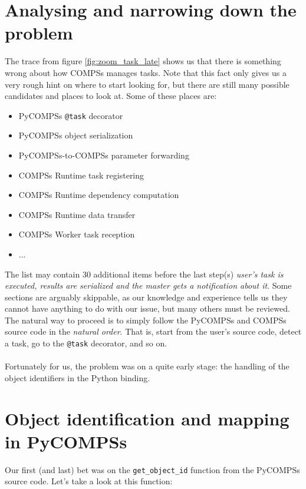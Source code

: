 \section{Analysing and narrowing down the problem}
The trace from figure \ref{fig:zoom_task_late} shows us that there is something wrong about how COMPSs manages tasks. Note that this fact only gives us a very rough hint on where to start looking for, but there are still many possible candidates and places to look at. Some of these places are:
\begin{itemize}
\item PyCOMPSs \verb|@task| decorator
\item PyCOMPSs object serialization
\item PyCOMPSs-to-COMPSs parameter forwarding
\item COMPSs Runtime task registering
\item COMPSs Runtime dependency computation
\item COMPSs Runtime data transfer
\item COMPSs Worker task reception
\item ...
\end{itemize}
The list may contain 30 additional items before the last step(s) \textit{user's task is executed, results are serialized and the master gets a notification about it}. Some sections are arguably skippable, as our knowledge and experience tells us they cannot have anything to do with our issue, but many others must be reviewed. The natural way to proceed is to simply follow the PyCOMPSs and COMPSs source code in the \textit{natural order}. That is, start from the user's source code, detect a task, go to the \verb|@task| decorator, and so on.\\
\\
Fortunately for us, the problem was on a quite early stage: the handling of the object identifiers in the Python binding.

\section{Object identification and mapping in PyCOMPSs}
Our first (and last) bet was on the \verb|get_object_id| function from the PyCOMPSs source code. Let's take a look at this function:

\inputminted{python}{snippets/get_object_id_old.py}



